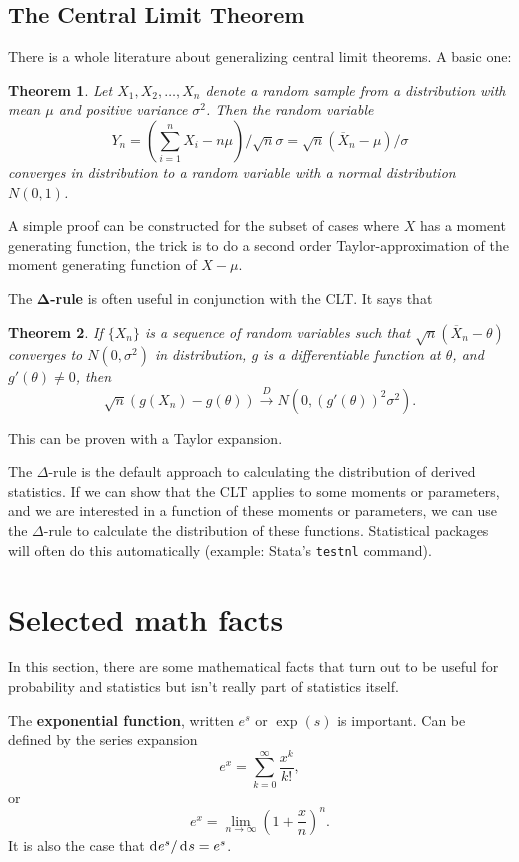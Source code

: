 \documentclass[twoside]{article}
\newtheorem{theorem}{Theorem}%
\begin{document}
\subsection{The Central Limit Theorem}
There is a whole literature about generalizing central limit theorems. A basic one:

\begin{theorem}
Let $X_1,X_2,\dots,X_n$ denote a random sample from a distribution with mean
$\mu$ and positive variance $\sigma^2$. Then the random variable \[ Y_n =
\left(\sum_{i=1}^n X_i - n\mu \right)/\sqrt{n}\sigma =
\sqrt{n}(\overline{X}_n-\mu)/\sigma\] converges in distribution to a random
variable with a normal distribution $N(0,1)$. 
\end{theorem}

A simple proof can be constructed for the subset of cases where $X$ has a moment generating
function, the trick is to do a second order Taylor-approximation of the moment generating
function of $X-\mu$. 

The $\mathbf{\Delta}$\textbf{-rule} is often useful in conjunction with the CLT.
It says that 

\begin{theorem}
If $\{X_n\}$ is a sequence of random variables such that $\sqrt{n}(\overline{X}_n-\theta)$
converges to $N(0,\sigma^2)$ in distribution, $g$ is a differentiable function at $\theta$,
and $g'(\theta)\neq 0$, then 
\[ \sqrt{n}\left(g(X_n) - g(\theta)\right) \xrightarrow{D} 
N\left(0, \left(g'(\theta)\right)^2\sigma^2\right).\]
\end{theorem}
This can be proven with a Taylor expansion. 

The $\Delta$-rule is the default approach to calculating the distribution of derived
statistics. If we can show that the CLT applies to some moments or parameters,
and we are interested in a function of these moments or parameters, we can use the 
$\Delta$-rule to calculate the distribution of these functions. Statistical packages
will often do this automatically (example: Stata's \texttt{testnl} command).

\section{Selected math facts}
In this section, there are some mathematical facts that turn out to be useful
for probability and statistics but isn't really part of statistics itself.

The \textbf{exponential function}, written $e^s$ or $\exp(s)$ is important. Can be defined by the
series expansion \[ e^x = \sum_{k=0}^\infty \frac{x^k}{k!},\] or
\[ e^x = \lim_{n\rightarrow \infty} \left( 1 + \frac{x}{n} \right)^n. \]
It is also the case that  $\rd e^s / \rd s =e^s$.
\end{document}
